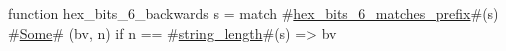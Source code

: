 function hex_bits_6_backwards s =
  match #\hyperref[sailRISCVzhexzybitszy6zymatcheszyprefix]{hex\_bits\_6\_matches\_prefix}#(s) {
      #\hyperref[sailRISCVzSome]{Some}# (bv, n) if n == #\hyperref[sailRISCVzstringzylength]{string\_length}#(s) => bv
  }
